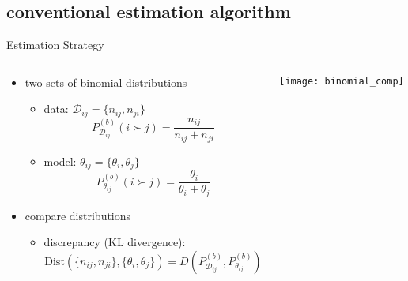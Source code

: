 \documentclass[fleqn,aspectratio=1610]{beamer}
\begin{document}
\subsection{conventional estimation algorithm}
\label{sec:org311c064}
\begin{frame}[label={sec:orgcb20136}]{Estimation Strategy}
\begin{columns}
\begin{column}{0.5\columnwidth}
\begin{itemize}
\item two sets of binomial distributions
\begin{itemize}
\item data: \(\mathcal{D}_{ij}=\{n_{ij},n_{ji}\}\) 
\begin{equation}
  P^{(b)}_{\mathcal{D}_{ij}}(i\succ j)
  =\frac{n_{ij}}{n_{ij}+n_{ji}}
\end{equation}
\item model: \(\theta_{ij}=\{\theta_i,\theta_j\}\) 
\begin{equation}
  P^{(b)}_{\theta_{ij}}(i\succ j)
  =\frac{\theta_i}{\theta_i+\theta_j}
\end{equation}
\end{itemize}
\item compare distributions
\begin{itemize}
\item discrepancy (KL divergence):
\begin{equation}
  \mathrm{Dist}(\{n_{ij},n_{ji}\},\{\theta_i,\theta_j\})
  =D(P^{(b)}_{\mathcal{D}_{ij}},P^{(b)}_{\theta_{ij}})
\end{equation}
\end{itemize}
\end{itemize}
\end{column}
\begin{column}{0.5\columnwidth}
\begin{center}
\texttt{[image: binomial\_comp]}
\end{center}
\end{column}
\end{columns}
\end{frame}
\end{document}
